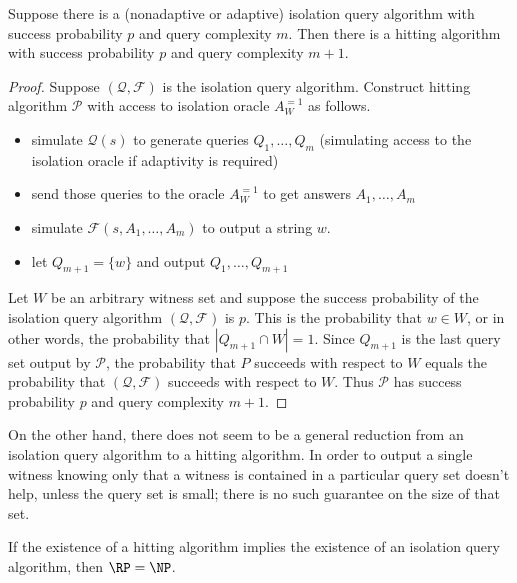 \documentclass{article}
\newcommand{\mc}{\mathcal}
\begin{document}
\begin{lemma}\label{lem:reduction}
  Suppose there is a (nonadaptive or adaptive) isolation query algorithm with success probability $p$ and query complexity $m$.
  Then there is a hitting algorithm with success probability $p$ and query complexity $m + 1$.
\end{lemma}
\begin{proof}
  Suppose $(\mc{Q}, \mc{F})$ is the isolation query algorithm.
  Construct hitting algorithm $\mc{P}$ with access to isolation oracle $A^{=1}_W$ as follows.
  \begin{itemize}
  \item simulate $\mc{Q}(s)$ to generate queries $Q_1, \dotsc, Q_m$ (simulating access to the isolation oracle if adaptivity is required)
  \item send those queries to the oracle $A^{=1}_W$ to get answers $A_1, \dotsc, A_m$
  \item simulate $\mc{F}(s, A_1, \dotsc, A_m)$ to output a string $w$.
  \item let $Q_{m + 1} = \{ w \}$ and output $Q_1, \dotsc, Q_{m + 1}$
  \end{itemize}

  Let $W$ be an arbitrary witness set and suppose the success probability of the isolation query algorithm $(\mc{Q}, \mc{F})$ is $p$.
  This is the probability that $w \in W$, or in other words, the probability that $|Q_{m + 1} \cap W| = 1$.
  Since $Q_{m + 1}$ is the last query set output by $\mc{P}$, the probability that $P$ succeeds with respect to $W$ equals the probability that $(\mc{Q}, \mc{F})$ succeeds with respect to $W$.
  Thus $\mc{P}$ has success probability $p$ and query complexity $m + 1$.
\end{proof}

On the other hand, there does not seem to be a general reduction from an isolation query algorithm to a hitting algorithm.
In order to output a single witness knowing only that a witness is contained in a particular query set doesn't help, unless the query set is small; there is no such guarantee on the size of that set.

\begin{conjecture}
  If the existence of a hitting algorithm implies the existence of an isolation query algorithm, then $\RP = \NP$.
\end{conjecture}
\end{document}
